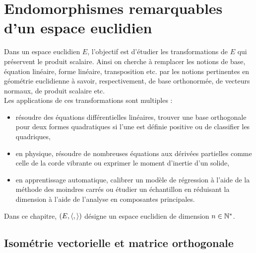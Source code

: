\documentclass{book}
\begin{document}
\chapter*{Endomorphismes remarquables d'un espace euclidien}

Dans un espace euclidien $E$, l'objectif est  d'étudier les transformations de $E$ qui préservent le produit scalaire. Ainsi on cherche à remplacer
les notions de base, équation linéaire, forme linéaire, transposition etc. par les notions
pertinentes en géométrie euclidienne à savoir, respectivement, de base orthonormée,
de vecteurs normaux, de produit scalaire etc.\\
Les applications de ces transformations sont multiples :
\begin{itemize}
\item  résoudre des équations différentielles linéaires,  trouver une base orthogonale pour deux formes quadratiques si l'une est définie positive ou de classifier les quadriques,
\item en physique,  résoudre de nombreuses équations aux dérivées partielles comme celle de la corde vibrante ou exprimer le moment d'inertie d'un solide,
\item en apprentissage automatique, calibrer un modèle de régression à l'aide de la méthode des moindres carrés ou étudier un échantillon en réduisant la dimension à l'aide de l'analyse en composantes principales.
\end{itemize} 
Dans ce chapitre, $(E,\langle,\rangle)$ désigne un espace euclidien de dimension $n\in \mathbb{N}^*$. 
\section{Isométrie vectorielle et matrice orthogonale}
\end{document}
